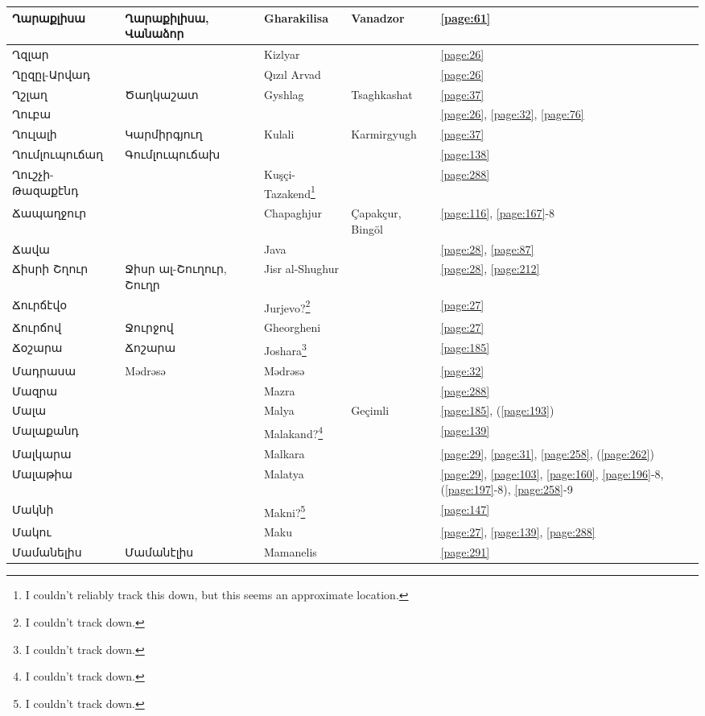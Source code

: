 \begin{center}
\begin{longtable}{|p{}|p{3cm}|p{3cm}|p{2cm}|p{3cm}|}
Ղարաքլիսա&Ղարաքիլիսա, Վանաձոր &Gharakilisa & Vanadzor &\ref{page:61}\\ \hline
Ղզլար& &Kizlyar & &\ref{page:26}\\ \hline
Ղըզըլ-Արվադ& &Qızıl Arvad & &\ref{page:26}\\ \hline
Ղշլաղ&  Ծաղկաշատ&Gyshlag &Tsaghkashat &\ref{page:37}\\ \hline
Ղուբա& & & &\ref{page:26}, \ref{page:32}, \ref{page:76}\\ \hline
Ղուլալի&Կարմիրգյուղ &Kulali & Karmirgyugh  &\ref{page:37}\\ \hline
Ղումլուպուճաղ& Գումլուպուճախ& & &\ref{page:138}\\ \hline
Ղուշչի-Թազաքէնդ& & Kuşçi-Tazakend\footnote{I couldn't reliably track this down, but this seems an approximate location.}& &\ref{page:288}\\ \hline
Ճապաղջուր& &Chapaghjur & Çapakçur, Bingöl&\ref{page:116}, \ref{page:167}-8\\ \hline
Ճավա& & Java& &\ref{page:28}, \ref{page:87}\\ \hline
Ճիսրի Շղուր& Ջիսր ալ-Շուղուր, Շուղր&Jisr al-Shughur & &\ref{page:28}, \ref{page:212}\\ \hline
Ճուրճէվօ& &Jurjevo?\footnote{I couldn't track down.} & &\ref{page:27}\\ \hline
Ճուրճով& Ջուրջով&Gheorgheni & &\ref{page:27}\\ \hline
Ճօշարա&Ճոշարա &Joshara\footnote{I couldn't track down. } & &\ref{page:185}\\ \hline
Մադրասա&Mədrəsə& Mədrəsə& &\ref{page:32}\\ \hline
Մազրա& &Mazra & &\ref{page:288}\\ \hline
Մալա& & Malya& Geçimli&\ref{page:185}, (\ref{page:193})\\ \hline
Մալաքանդ& & Malakand?\footnote{I couldn't track down.}& &\ref{page:139}\\ \hline
Մալկարա& &Malkara & &\ref{page:29}, \ref{page:31}, \ref{page:258}, (\ref{page:262})\\ \hline
Մալաթիա& & Malatya& &\ref{page:29}, \ref{page:103}, \ref{page:160}, \ref{page:196}-8, (\ref{page:197}-8), \ref{page:258}-9\\ \hline
Մակնի& & Makni?\footnote{I couldn't track down.}& &\ref{page:147}\\ \hline
Մակու& & Maku& &\ref{page:27}, \ref{page:139}, \ref{page:288}\\ \hline
Մամանելիս& Մամանէլիս& Mamanelis& &\ref{page:291}\\ \hline

\end{longtable}
\end{center}
